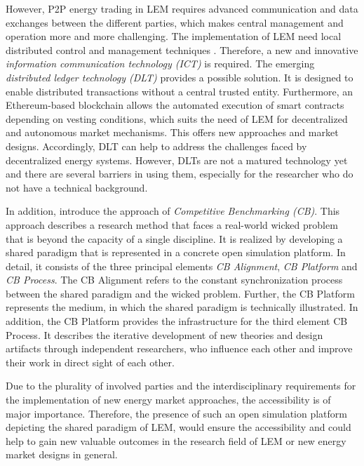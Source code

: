 However, P2P energy trading in LEM requires advanced communication and data exchanges between the different parties, 
which makes central management and operation more and more challenging. The implementation of LEM need local 
distributed control and management techniques . 
Therefore, a new and innovative \textit{information communication technology (ICT)} is required.  
The emerging \textit{distributed ledger technology (DLT)} provides a possible solution. 
It is designed to enable distributed transactions without a central trusted entity. 
Furthermore, an Ethereum-based blockchain allows the automated execution of smart contracts depending 
on vesting conditions, which suits the need of LEM for decentralized and autonomous market mechanisms. 
This offers new approaches and market designs. Accordingly, DLT can help to address the challenges 
faced by decentralized energy systems. However, DLTs are not a matured technology yet and 
there are several barriers in using them, especially for the researcher who do not have a technical background. 

In addition,  introduce the approach of \textit{Competitive Benchmarking (CB)}. 
This approach describes a research method that faces a real-world wicked problem that is beyond the capacity of a single discipline. 
It is realized by developing a shared paradigm that is represented in a concrete open simulation platform. 
In detail, it consists of the three principal elements \textit{CB Alignment}, \textit{CB Platform} and \textit{CB Process}. 
The CB Alignment refers to the constant synchronization process between the shared paradigm and the wicked problem. 
Further, the CB Platform represents the medium, in which the shared paradigm is technically illustrated. 
In addition, the CB Platform provides the infrastructure for the third element CB Process. 
It describes the iterative development of new theories and design artifacts through independent researchers, 
who influence each other and improve their work in direct sight of each other. 

Due to the plurality of involved parties and the interdisciplinary requirements for the 
implementation of new energy market approaches, the accessibility is of major importance.
Therefore, the presence of such an open simulation platform depicting the shared paradigm of LEM, 
would ensure the accessibility and could help to gain new valuable outcomes in the research field 
of LEM or new energy market designs in general. 

